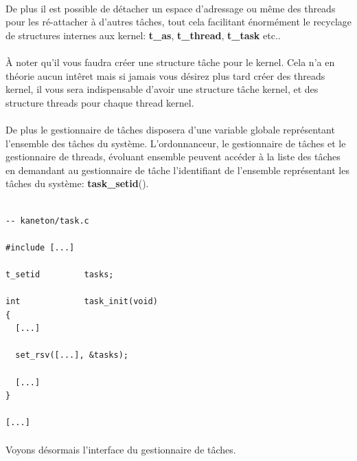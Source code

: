 \documentclass[10pt,a4wide]{article}
\begin{document}
\paragraph{}

De plus il est possible de d\'etacher un espace d'adressage ou m\^eme
des threads pour les r\'e-attacher \`a d'autres t\^aches, tout cela
facilitant \'enorm\'ement le recyclage de structures internes aux
kernel: \textbf{t\_as}, \textbf{t\_thread}, \textbf{t\_task} etc..

\paragraph{}

\`A noter qu'il vous faudra cr\'eer une structure t\^ache pour le kernel.
Cela n'a en th\'eorie aucun int\^eret mais si jamais vous d\'esirez plus
tard cr\'eer des threads kernel, il vous sera indispensable d'avoir une
structure t\^ache kernel, et des structure threads pour chaque thread
kernel.

\paragraph{}

De plus le gestionnaire de t\^aches disposera d'une variable globale
repr\'esentant l'ensemble des t\^aches du syst\`eme. L'ordonnanceur,
le gestionnaire de t\^aches et le gestionnaire de threads, \'evoluant
ensemble peuvent acc\'eder \`a la liste des t\^aches en demandant
au gestionnaire de t\^ache l'identifiant de l'ensemble repr\'esentant
les t\^aches du syst\`eme: \textbf{task\_setid}().

\begin{verbatim}

-- kaneton/task.c

#include [...]

t_setid         tasks;

int             task_init(void)
{
  [...]

  set_rsv([...], &tasks);

  [...]
}

[...]

\end{verbatim}

\paragraph{}

Voyons d\'esormais l'interface du gestionnaire de t\^aches.
\end{document}
